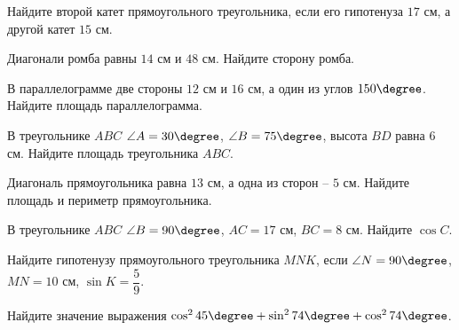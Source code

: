 \begin{exam}
	\begin{listofex}
		\item Найдите второй катет прямоугольного треугольника, если его гипотенуза \( 17 \) см, а другой катет \( 15 \) см.
		\item  Диагонали ромба равны \( 14 \) см и \( 48 \) см. Найдите сторону ромба.
		\item  В параллелограмме две стороны \( 12 \) см и \( 16 \) см, а один из углов \( 150\degree \). Найдите площадь параллелограмма.
		\item В треугольнике \( ABC \) \( \angle A = 30\degree \), \( \angle B = 75\degree \), высота \( BD \) равна \( 6 \) см. Найдите площадь треугольника \( ABC \).
		\item Диагональ прямоугольника равна \( 13 \) см, а одна из сторон – \( 5 \) см. Найдите площадь и периметр прямоугольника.
		\item В треугольнике \( ABC \) \( \angle B = 90\degree \), \( AC = 17 \) см, \( BC = 8 \) см. Найдите \( \cos C \).
		\item  Найдите гипотенузу прямоугольного треугольника \( MNK  \), если  \( \angle N = 90\degree \), \( MN = 10 \) см, \( \sin K = \dfrac{5}{9} \).		
		\item  Найдите значение выражения \( \cos^{2} 45\degree + \sin^{2} 74\degree + \cos^{2} 74\degree \).
	\end{listofex}
\end{exam}

